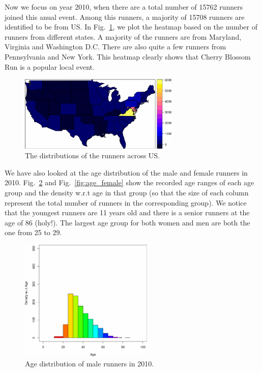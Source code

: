 \documentclass[twocolumn]{article}
\begin{document}
Now we focus on year 2010, when there are a total number of 15762 runners joined
this anual event. Among this runners, a majority of 15708 runners are identified
to be from US. In Fig.~\ref{fig:heatmap}, we plot the heatmap based on the
number of runners from different states. A majority of the runners are from
Maryland, Virginia and Washington D.C. There are also quite a few runners from
Pennsylvania and New York. This heatmap clearly shows that Cherry Blossom Run is
a popular local event.

\begin{figure}[h]
    \centering
    \includegraphics[width=3in]{figs/heatmap_usa_2010.pdf}
    \caption{The distributions of the runners across US.}
    \label{fig:heatmap}
\end{figure}

We have also looked at the age distribution of the male and female runners in
2010. Fig.~\ref{fig:age_male} and Fig.~\ref{fig:age_female} show the recorded
age ranges of each age group and the density w.r.t age in that group (so that
the size of each column represent the total number of runners in the
corresponding group). We notice that the youngest runners are 11 years old
and there is a senior runners at the age of 86 (holy!). The largest age group
for both women and men are both the one from 25 to 29.

\begin{figure}[h]
    \centering
    \includegraphics[width=2.5in]{figs/group_m2010.pdf}
    \caption{Age distribution of male runners in 2010.}
    \label{fig:age_male}
\end{figure}
\end{document}

